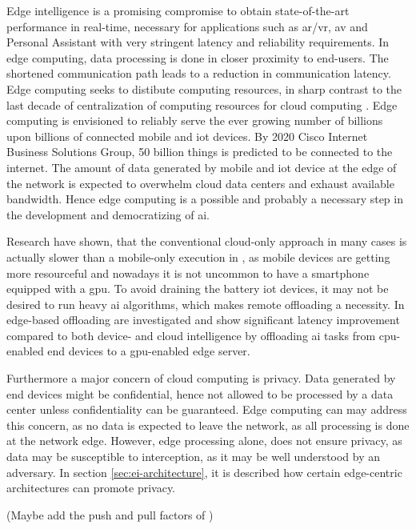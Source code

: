 Edge intelligence is a promising compromise to obtain state-of-the-art performance in real-time, necessary for applications such as \gls{ar}/\gls{vr}, \gls{av} and Personal Assistant with very stringent latency and reliability requirements. In edge computing, data processing is done in closer proximity to end-users. The shortened communication path leads to a reduction in communication latency. Edge computing seeks to distibute computing resources, in sharp contrast to the last decade of centralization of computing resources for cloud computing \cite{shi_edge_2016}. Edge computing is envisioned to reliably serve the ever growing number of billions upon billions of connected mobile and \gls{iot} devices. By 2020 Cisco Internet Business Solutions Group, 50 billion things is predicted to be connected to the internet. The amount of data generated by mobile and \gls{iot} device at the edge of the network is expected to overwhelm cloud data centers and exhaust available bandwidth. Hence edge computing is a possible and probably a necessary step in the development and democratizing of \gls{ai}.

Research have shown, that the conventional cloud-only approach in many cases is actually slower than a mobile-only execution in \cite{kang_neurosurgeon:_2017}, as mobile devices are getting more resourceful and nowadays it is not uncommon to have a smartphone equipped with a \gls{gpu}. To avoid draining the battery \gls{iot} devices, it may not be desired to run heavy \gls{ai} algorithms, which makes remote offloading a necessity.  In \cite{karlsen_prototyping_nodate} edge-based offloading are investigated and show significant latency improvement compared to both device- and cloud intelligence by offloading \gls{ai} tasks from \gls{cpu}-enabled end devices to a \gls{gpu}-enabled edge server. 

Furthermore a major concern of cloud computing is privacy. Data generated by end devices might be confidential, hence not allowed to be processed by a data center unless confidentiality can be guaranteed.  Edge computing can may address this concern, as no data is expected to leave the network, as all processing is done at the network edge. However, edge processing alone, does not ensure privacy, as data may be susceptible to interception, as it may be well understood by an adversary. In section \ref{sec:ei-architecture}, it is described how certain edge-centric architectures can promote privacy. 

(Maybe add the push and pull factors of \cite{zhou_edge_2019}) 
 
